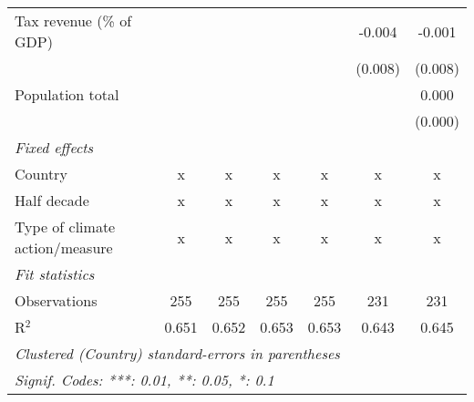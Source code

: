 \begin{tabular}{lcccccc}
   Tax revenue (\% of GDP)                       &         &         &             &             & -0.004      & -0.001\\   
                                                 &         &         &             &             & (0.008)     & (0.008)\\   
   Population total                              &         &         &             &             &             & 0.000\\   
                                                 &         &         &             &             &             & (0.000)\\   
   \emph{Fixed effects}\\
   Country                                       & x       & x       & x           & x           & x           & x\\  
   Half decade                                   & x       & x       & x           & x           & x           & x\\  
   Type of climate action/measure                & x       & x       & x           & x           & x           & x\\  
   \midrule \emph{Fit statistics}\\
   Observations                                  & 255     & 255     & 255         & 255         & 231         & 231\\  
   R$^2$                                         & 0.651   & 0.652   & 0.653       & 0.653       & 0.643       & 0.645\\  
   \midrule
   \multicolumn{7}{l}{\emph{Clustered (Country) standard-errors in parentheses}}\\
   \multicolumn{7}{l}{\emph{Signif. Codes: ***: 0.01, **: 0.05, *: 0.1}}\\
\end{tabular}
\par\endgroup


